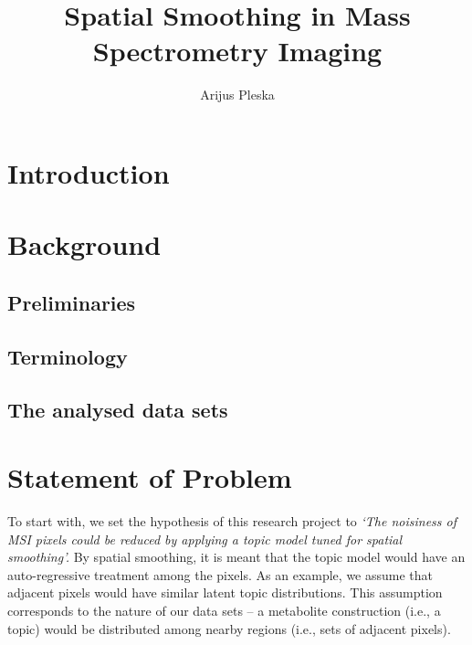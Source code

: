 \documentclass{mpaper}
\begin{document}
\title{Spatial Smoothing in Mass Spectrometry Imaging}
\author{Arijus Pleska}

\maketitle

\begin{abstract}
\lipsum[1]
\end{abstract}

\section{Introduction}

\lipsum[1-3]

\section{Background}
\lipsum[1]
\subsection{Preliminaries}
\lipsum[1-3]
\subsection{Terminology}
\subsection{The analysed data sets}
\lipsum[1]

\section{Statement of Problem}

\par To start with, we set the hypothesis of this research project to \textit{`The noisiness of MSI pixels could be reduced by applying a topic model tuned for spatial smoothing'.} By spatial smoothing, it is meant that the topic model would have an auto-regressive treatment among the pixels. As an example, we assume that adjacent pixels would have similar latent topic distributions. This assumption corresponds to the nature of our data sets -- a metabolite construction (i.e., a topic) would be distributed among nearby regions (i.e., sets of adjacent pixels).
\end{document}
